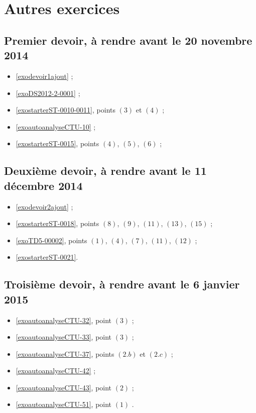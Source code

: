 \section{Autres exercices}



\subsection*{Premier devoir, à rendre avant le 20 novembre 2014}
\begin{itemize}
\item \ref{exodevoir1ajout} ;%
\item \ref{exoDS2012-2-0001} ;%
\item \ref{exostarterST-0010-0011}, points $(3)$ et  $(4)$ ;%
\item \ref{exoautoanalyseCTU-10} ;%
\item \ref{exostarterST-0015}, points $(4)$, $(5)$, $(6)$ ;%
\end{itemize}
\subsection*{Deuxième devoir, à rendre avant le 11 décembre 2014}
\begin{itemize}
\item \ref{exodevoir2ajout} ;%
\item  \ref{exostarterST-0018}, points $(8)$, $(9)$, $(11)$, $(13)$, $(15)$ ;
\item  \ref{exoTD5-00002}, points $(1)$, $(4)$, $(7)$, $(11)$, $(12)$ ;
\item  \ref{exostarterST-0021}.%
\end{itemize}
\subsection*{Troisième devoir, à rendre avant le 6 janvier 2015}
\begin{itemize}
\item \ref{exoautoanalyseCTU-32}, point $(3)$ ; %
\item   \ref{exoautoanalyseCTU-33}, point $(3)$ ; %
\item   \ref{exoautoanalyseCTU-37}, points $(2.b)$ et $(2.c)$ ;%
\item   \ref{exoautoanalyseCTU-42} ;%
\item   \ref{exoautoanalyseCTU-43}, point $(2)$ ;%
\item   \ref{exoautoanalyseCTU-51}, point $(1)$ .%
\end{itemize}

